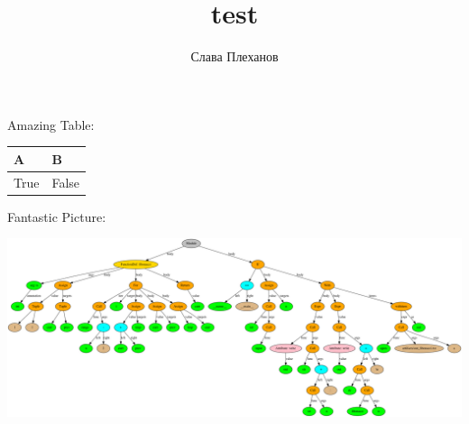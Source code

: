 \documentclass{article}
\title{test}
\author{Слава Плеханов}
\begin{document}
    \begin{center}
        Amazing Table:
    \end{center}
\begin{tabular}{ | l | l | }
\hline
A & B \\ \hline
True & False\\
\hline\end{tabular}
    \hfill \break
    \hfill \break
    \hfill \break
    \hfill \break
    \hfill \break

    \begin{center}
        Fantastic Picture:
    \end{center}
\includegraphics[scale=0.15]{tree.png}
\end{document}

